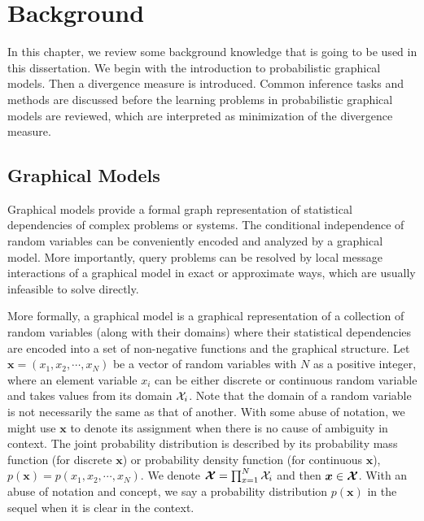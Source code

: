 \chapter{Background}
\label{chapter2}
In this chapter, we review some background knowledge that is going to be used in this dissertation. We begin with the introduction to probabilistic graphical models. Then a divergence measure is introduced. Common inference tasks and methods are discussed before the learning problems in probabilistic graphical models are reviewed, which are interpreted as minimization of the divergence measure.

\section{Graphical Models}
\label{chpt2:sec:graphical-models}
Graphical models provide a formal graph representation of statistical dependencies of complex problems or systems. The conditional independence of random variables can be conveniently encoded and analyzed by a graphical model. More importantly, query problems can be resolved by local message interactions of a graphical model in exact or approximate ways, which are usually infeasible to solve directly.

More formally, a graphical model is a graphical representation of a collection of random variables (along with their domains) where their statistical dependencies are encoded into a set of non-negative functions and the graphical structure. Let $\bm{x}= (x_1, x_2, \cdots, x_N)$ be a vector of random variables with $N$ as a positive integer, where an element variable $x_i$ can be either discrete or continuous random variable and takes values from its domain $\mathcal{X}_i$. Note that the domain of a random variable is not necessarily the same as that of another. With some abuse of notation, we might use $\bm{x}$ to denote its assignment when there is no cause of ambiguity in context. The joint probability distribution is described by its probability mass function (for discrete $\bm{x}$) or probability density function (for continuous $\bm{x}$), $p(\bm{x})=p(x_1, x_2, \cdots, x_N)$. We denote $\bm{\mathcal{X}} = \prod_{x=1}^{N} \mathcal{X}_i$ and then $\bm{x}\in \bm{\mathcal{X}}$. With an abuse of notation and concept, we say a probability distribution $p(\bm{x})$ in the sequel when it is clear in the context.

